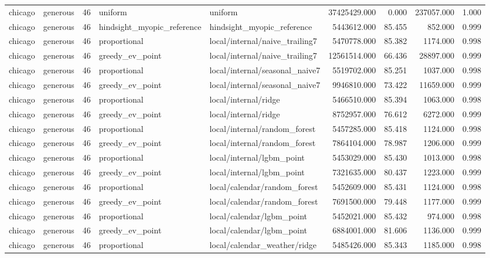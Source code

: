\begin{tabular}{llrllrrrr}
chicago & generous & 46 & uniform & uniform & 37425429.000 & 0.000 & 237057.000 & 1.000 \\
chicago & generous & 46 & hindsight\_myopic\_reference & hindsight\_myopic\_reference & 5443612.000 & 85.455 & 852.000 & 0.999 \\
chicago & generous & 46 & proportional & local/internal/naive\_trailing7 & 5470778.000 & 85.382 & 1174.000 & 0.998 \\
chicago & generous & 46 & greedy\_ev\_point & local/internal/naive\_trailing7 & 12561514.000 & 66.436 & 28897.000 & 0.999 \\
chicago & generous & 46 & proportional & local/internal/seasonal\_naive7 & 5519702.000 & 85.251 & 1037.000 & 0.998 \\
chicago & generous & 46 & greedy\_ev\_point & local/internal/seasonal\_naive7 & 9946810.000 & 73.422 & 11659.000 & 0.999 \\
chicago & generous & 46 & proportional & local/internal/ridge & 5466510.000 & 85.394 & 1063.000 & 0.998 \\
chicago & generous & 46 & greedy\_ev\_point & local/internal/ridge & 8752957.000 & 76.612 & 6272.000 & 0.999 \\
chicago & generous & 46 & proportional & local/internal/random\_forest & 5457285.000 & 85.418 & 1124.000 & 0.998 \\
chicago & generous & 46 & greedy\_ev\_point & local/internal/random\_forest & 7864104.000 & 78.987 & 1206.000 & 0.999 \\
chicago & generous & 46 & proportional & local/internal/lgbm\_point & 5453029.000 & 85.430 & 1013.000 & 0.998 \\
chicago & generous & 46 & greedy\_ev\_point & local/internal/lgbm\_point & 7321635.000 & 80.437 & 1223.000 & 0.999 \\
chicago & generous & 46 & proportional & local/calendar/random\_forest & 5452609.000 & 85.431 & 1124.000 & 0.998 \\
chicago & generous & 46 & greedy\_ev\_point & local/calendar/random\_forest & 7691500.000 & 79.448 & 1177.000 & 0.999 \\
chicago & generous & 46 & proportional & local/calendar/lgbm\_point & 5452021.000 & 85.432 & 974.000 & 0.998 \\
chicago & generous & 46 & greedy\_ev\_point & local/calendar/lgbm\_point & 6884001.000 & 81.606 & 1136.000 & 0.999 \\
chicago & generous & 46 & proportional & local/calendar\_weather/ridge & 5485426.000 & 85.343 & 1185.000 & 0.998 \\

\end{tabular}
